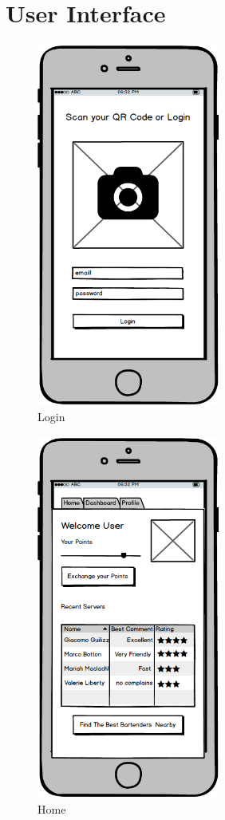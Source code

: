 \documentclass{scrreprt}
\begin{document}
\chapter{User Interface}

\begin{figure}[!htb]
    \includegraphics[width=6cm, height=12cm]{mockups/Login}
    \centering
    \caption{Login}
\end{figure}

\begin{figure}[!htb]
    \includegraphics[width=6cm, height=12cm]{mockups/Home}
    \centering
    \caption{Home}
\end{figure}
\end{document}
